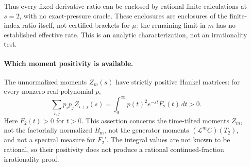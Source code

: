 Thus every fixed derivative ratio can be enclosed by rational finite
calculations at $s=2$, with no exact-pressure oracle.  These enclosures
are enclosures of the finite-index ratio itself, not certified brackets
for $\mu$: the remaining limit in $m$ has no established effective
rate.  This is an analytic characterization, not an irrationality test.

\paragraph{Which moment positivity is available.}
The unnormalized moments $Z_m(s)$ have strictly positive Hankel matrices:
for every nonzero real polynomial $p$,
\[
 \sum_{i,j}p_ip_j Z_{i+j}(s)
 =\int_0^\infty p(t)^2e^{-st}F_2(t)\,dt>0.
\]
Here $F_2(t)>0$ for $t>0$.  This assertion concerns the time-tilted
moments $Z_m$, not the factorially normalized $B_m$, not the generator
moments $(\mathcal L^mC)(T_2)$, and not a spectral measure for $F_2'$.
The integral values are not known to be rational, so their positivity
does not produce a rational continued-fraction irrationality proof.
